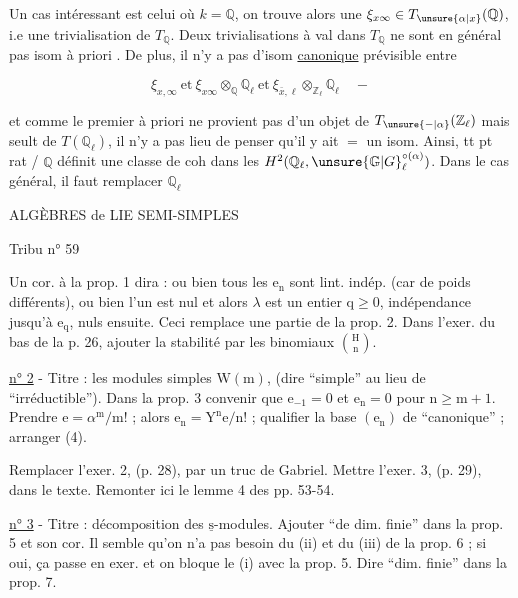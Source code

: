 Un cas intéressant est celui où $k=\mathbb{Q}$, on trouve alors une  $\xi_{x\infty}\in T_{\unsure{\alpha|x}}(\mathbb{Q})$, i.e une trivialisation de $T_{\mathbb{Q}}$. Deux trivialisations à val dans $T_{\mathbb{Q}}$ ne sont en général pas isom à priori . De plus, il n’y a pas d’isom \uline{canonique} prévisible entre

\[
\xi_{x,\infty}\ \text{et}\ \xi_{x\infty}\otimes_{\mathbb{Q}}\mathbb{Q}_{\ell}\ \text{et}\ \xi_{\bar{x},\ell}\otimes_{\mathbb{Z}_{\ell}}\mathbb{Q}_{\ell}\quad -
\]

 et comme le premier à priori ne provient pas d’un objet de $T_{\unsure{-|\alpha}}(\mathbb{Z}_\ell)$ mais seult de $T(\mathbb{Q}_\ell)$, il n’y a pas lieu de penser qu’il y ait $=$ un isom. Ainsi, tt pt rat / $\mathbb{Q}$ définit une classe de coh dans les $H^{2}(\mathbb{Q}_\ell,\unsure{\mathbb{G}|G}^{\circ(\alpha)}_{\ell})$. Dans le  cas général, il faut remplacer $\mathbb{Q}_\ell$


ALGÈBRES de LIE SEMI-SIMPLES 

Tribu n° 59

Un cor. à la prop. 1 dira : ou bien tous les $\mathrm{e}_{\mathrm n}$ sont lint. indép. (car de poids différents), ou bien l'un est nul et alors $\lambda$ est un entier $\mathrm{q}\geqslant 0$, indépendance jusqu'à $\mathrm{e}_{\mathrm q}$, nuls ensuite. Ceci remplace une partie de la prop. 2. Dans l'exer. du bas de la p. 26, ajouter la stabilité par les binomiaux $\binom{\mathrm{H}}{\mathrm{n}}$.

\uline{n° 2} - Titre : les modules simples $\mathrm{W}(\mathrm{m})$, (dire ``simple'' au lieu de ``irréductible''). Dans la prop. 3 convenir que $\mathrm{e}_{-1}=0$ et $\mathrm{e}_{\mathrm n}=0$ pour $\mathrm{n}\geqslant\mathrm{m}+1$. Prendre $\mathrm{e}=\alpha^{\mathrm m}/\mathrm{m}!$ ; alors $\mathrm{e}_{\mathrm n}=\mathrm{Y}^{\mathrm n}\mathrm{e}/\mathrm{n}!$ ; qualifier la base $(\mathrm{e}_{\mathrm n})$ de ``canonique'' ; arranger (4).

Remplacer l'exer. 2, (p. 28), par un truc de Gabriel. Mettre l'exer. 3, (p. 29), dans le texte. Remonter ici le lemme 4 des pp. 53-54.

\uline{n° 3} - Titre : décomposition des $\underline{\mathrm{s}}$-modules. Ajouter ``de dim. finie'' dans la prop. 5 et son cor. Il semble qu'on n'a pas besoin du (ii) et du (iii) de la prop. 6 ; si oui, ça passe en exer. et on bloque le (i) avec la prop. 5. Dire ``dim. finie'' dans la prop. 7.

